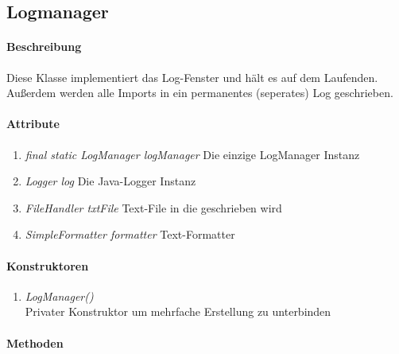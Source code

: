 \subsection{Logmanager}

\paragraph{Beschreibung}
Diese Klasse implementiert das Log-Fenster und hält es auf dem Laufenden.
Außerdem werden alle Imports in ein permanentes (seperates) Log geschrieben.

\paragraph{Attribute}
\begin{enumerate}[$\bullet$]
	\item \textit{final static LogManager logManager}  Die einzige LogManager Instanz
	\item \textit{Logger log} Die Java-Logger Instanz
	\item \textit{FileHandler txtFile} Text-File in die geschrieben wird
	\item \textit{SimpleFormatter formatter} Text-Formatter
\end{enumerate}

\paragraph{Konstruktoren}
\begin{enumerate}[-]
	\item \textit{LogManager()} \\
	Privater Konstruktor um mehrfache Erstellung zu unterbinden
\end{enumerate}


\paragraph{Methoden}


